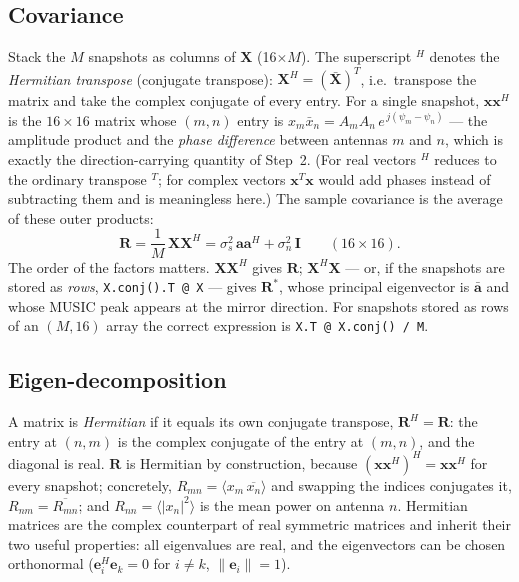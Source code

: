 \documentclass[11pt,a4paper]{article}
\newcommand{\vect}[1]{\mathbf{#1}}
\begin{document}
\subsection{Covariance}
Stack the $M$ snapshots as columns of $\vect X$ (16$\times M$). The superscript $^H$ denotes the \emph{Hermitian transpose} (conjugate transpose): $\vect X^H = (\bar{\vect X})^T$, i.e.\ transpose the matrix and take the complex conjugate of every entry. For a single snapshot, $\vect x\vect x^H$ is the $16\times16$ matrix whose $(m,n)$ entry is $x_m\bar x_n = A_mA_n\,e^{\,j(\psi_m-\psi_n)}$ --- the amplitude product and the \emph{phase difference} between antennas $m$ and $n$, which is exactly the direction-carrying quantity of Step~2. (For real vectors $^H$ reduces to the ordinary transpose $^T$; for complex vectors $\vect x^T\vect x$ would add phases instead of subtracting them and is meaningless here.) The sample covariance is the average of these outer products:
\begin{equation}
  \vect R = \frac{1}{M}\,\vect X\vect X^{H}
  = \sigma_s^2\,\vect a\vect a^{H} + \sigma_n^2\,\vect I \qquad (16\times 16).
  \label{eq:cov}
\end{equation}
The order of the factors matters. $\vect X\vect X^H$ gives $\vect R$; $\vect X^H\vect X$ --- or, if the snapshots are stored as \emph{rows}, \texttt{X.conj().T @ X} --- gives $\vect R^*$, whose principal eigenvector is $\bar{\vect a}$ and whose MUSIC peak appears at the mirror direction. For snapshots stored as rows of an $(M, 16)$ array the correct expression is \texttt{X.T @ X.conj() / M}.

\subsection{Eigen-decomposition}
A matrix is \emph{Hermitian} if it equals its own conjugate transpose, $\vect R^H = \vect R$: the entry at $(n,m)$ is the complex conjugate of the entry at $(m,n)$, and the diagonal is real. $\vect R$ is Hermitian by construction, because $(\vect x\vect x^H)^H = \vect x\vect x^H$ for every snapshot; concretely, $R_{mn} = \langle x_m\,\overline{x_n}\rangle$ and swapping the indices conjugates it, $R_{nm} = \overline{R_{mn}}$; and $R_{nn} = \langle |x_n|^2\rangle$ is the mean power on antenna $n$. Hermitian matrices are the complex counterpart of real symmetric matrices and inherit their two useful properties: all eigenvalues are real, and the eigenvectors can be chosen orthonormal ($\vect e_i^H\vect e_k = 0$ for $i \ne k$, $\|\vect e_i\| = 1$).
\end{document}

